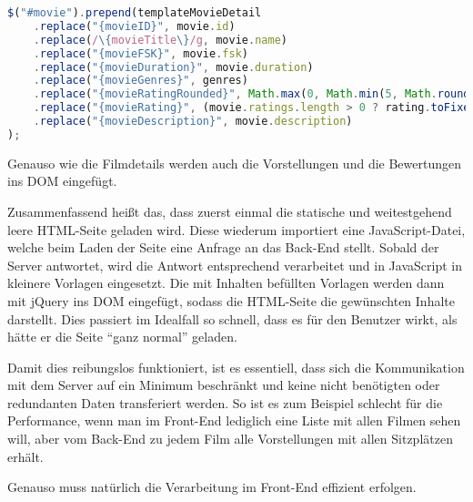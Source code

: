 \begin{lstlisting}[language=JavaScript, caption={Einfügen der Filmdetails ins \acs{DOM} mit jQuery}, label={lst:js_write_movie_detail_to_dom}]
$("#movie").prepend(templateMovieDetail
	.replace("{movieID}", movie.id)
	.replace(/\{movieTitle\}/g, movie.name)
	.replace("{movieFSK}", movie.fsk)
	.replace("{movieDuration}", movie.duration)
	.replace("{movieGenres}", genres)
	.replace("{movieRatingRounded}", Math.max(0, Math.min(5, Math.round(rating))))
	.replace("{movieRating}", (movie.ratings.length > 0 ? rating.toFixed(1).replace(".",",") : "") + " (" + movie.ratings.length + " Bewertung" + (movie.ratings.length == 1 ? "" : "en") + ")")
	.replace("{movieDescription}", movie.description)
);
\end{lstlisting}

Genauso wie die Filmdetails werden auch die Vorstellungen und die Bewertungen ins \acs{DOM} eingefügt.

Zusammenfassend heißt das, dass zuerst einmal die statische und weitestgehend leere \acs{HTML}-Seite geladen wird.
Diese wiederum importiert eine JavaScript-Datei, welche beim Laden der Seite eine Anfrage an das Back-End stellt.
Sobald der Server antwortet, wird die Antwort entsprechend verarbeitet und in JavaScript in kleinere Vorlagen eingesetzt.
Die mit Inhalten befüllten Vorlagen werden dann mit jQuery ins \acs{DOM} eingefügt, sodass die \acs{HTML}-Seite die gewünschten Inhalte darstellt.
Dies passiert im Idealfall so schnell, dass es für den Benutzer wirkt, als hätte er die Seite \enquote{ganz normal} geladen.

Damit dies reibungslos funktioniert, ist es essentiell, dass sich die Kommunikation mit dem Server auf ein Minimum beschränkt und keine nicht benötigten oder redundanten Daten transferiert werden.
So ist es zum Beispiel schlecht für die Performance, wenn man im Front-End lediglich eine Liste mit allen Filmen sehen will, aber vom Back-End zu jedem Film alle Vorstellungen mit allen Sitzplätzen erhält.

Genauso muss natürlich die Verarbeitung im Front-End effizient erfolgen.